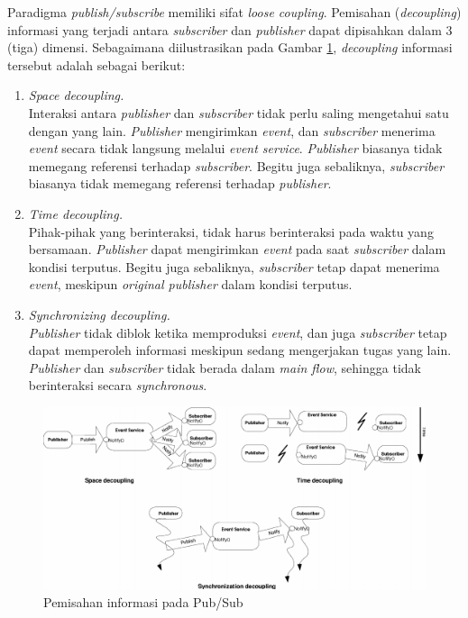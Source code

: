 Paradigma \textit{publish/subscribe} memiliki sifat \textit{loose coupling}. Pemisahan (\textit{decoupling}) informasi yang terjadi antara \textit{subscriber} dan \textit{publisher} dapat dipisahkan dalam 3 (tiga) dimensi. Sebagaimana diilustrasikan pada Gambar \ref{fig:space-time-sync-decoupling}, \textit{decoupling} informasi tersebut adalah sebagai berikut:

\begin{enumerate}
\item \textit{Space decoupling.} \\
Interaksi antara \textit{publisher} dan \textit{subscriber} tidak perlu saling mengetahui satu dengan yang lain. \textit{Publisher} mengirimkan \textit{event}, dan \textit{subscriber} menerima \textit{event} secara tidak langsung melalui \textit{event service}. \textit{Publisher} biasanya tidak memegang referensi terhadap \textit{subscriber}. Begitu juga sebaliknya, \textit{subscriber} biasanya tidak memegang referensi terhadap \textit{publisher}.
\item \textit{Time decoupling.} \\
Pihak-pihak yang berinteraksi, tidak harus berinteraksi pada waktu yang bersamaan. \textit{Publisher} dapat mengirimkan \textit{event} pada saat \textit{subscriber} dalam kondisi terputus. Begitu juga sebaliknya, \textit{subscriber} tetap dapat menerima \textit{event}, meskipun \textit{original publisher} dalam kondisi terputus.
\item \textit{Synchronizing decoupling.} \\
\textit{Publisher} tidak diblok ketika memproduksi \textit{event}, dan juga \textit{subscriber} tetap dapat memperoleh informasi meskipun sedang mengerjakan tugas yang lain. \textit{Publisher} dan \textit{subscriber} tidak berada dalam \textit{main flow}, sehingga tidak berinteraksi secara \textit{synchronous}.
\end{enumerate}


\begin{figure}[h]
	\centering
	\includegraphics[width=\textwidth]{Resources/Images/space-time-sync-decoupling}
	\caption{Pemisahan informasi pada Pub/Sub \citep{eugster_many_2003}}
	\label{fig:space-time-sync-decoupling}
\end{figure}
